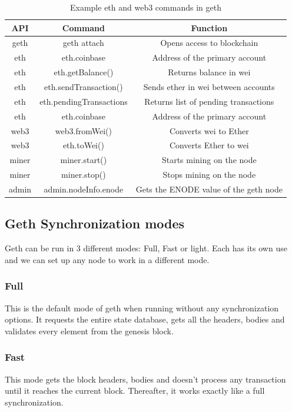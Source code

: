 \documentclass[11pt,openright]{report}
\begin{document}
\begin{table}[!htbp]
	\renewcommand{\arraystretch}{1.3}
	\caption{Example eth and web3 commands in geth}
	\label{geth_commands}
	\centering
	\begin{tabular}{|c|c|c|}
		\hline
		\bfseries API & \bfseries Command & \bfseries Function \\
		\hline\hline
		geth & geth attach & Opens access to blockchain \\ \hline
		eth & eth.coinbase & Address of the primary account \\ \hline
		eth & eth.getBalance() & Returns balance in wei \\ \hline
        eth & eth.sendTransaction() & Sends ether in wei between accounts \\ \hline
        eth & eth.pendingTransactions & Returns list of pending transactions\\ \hline
        eth & eth.coinbase & Address of the primary account \\ \hline
        web3 & web3.fromWei() & Converts wei to Ether \\ \hline
        web3 & eth.toWei() & Converts Ether to wei \\ \hline
        miner & miner.start() & Starts mining on the node \\ \hline
        miner & miner.stop() & Stops mining on the node \\ \hline
        admin & admin.nodeInfo.enode & Gets the ENODE value of the geth node \\ \hline
	\end{tabular}
\end{table}

\newpage
\subsection{Geth Synchronization modes}
Geth can be run in 3 different modes: Full, Fast or light. Each has its own use and we can set up any node to work in a different mode. 

\subsubsection{Full} 
This is the default mode of geth when running without any synchronization options. It requests the entire state database, gets all the headers, bodies and validates every element from the genesis block.

\subsubsection{Fast}
This mode gets the block headers, bodies and doesn't process any transaction until it reaches the current block. Thereafter, it works exactly like a full synchronization.
\end{document}
